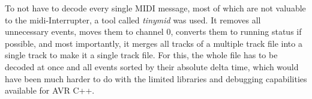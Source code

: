 To not have to decode every single MIDI message, most of which are not valuable to the \gls{midi}-Interrupter, a tool called \emph{tinymid} was used. It removes all unnecessary events, moves them to channel 0, converts them to running status if possible, and most importantly, it merges all tracks of a multiple track file into a single track to make it a single track file. For this, the whole file has to be decoded at once and all events sorted by their absolute delta time, which would have been much harder to do with the limited libraries and debugging capabilities available for AVR C++.